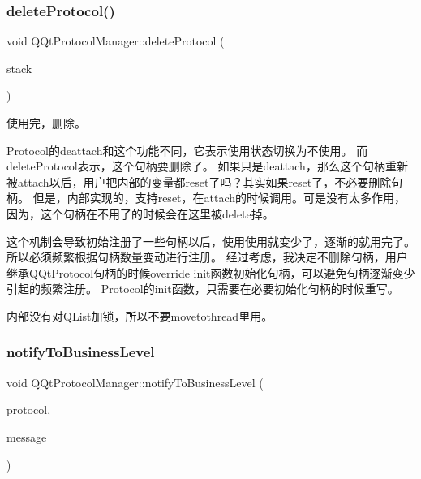 \subsubsection{\texorpdfstring{delete\+Protocol()}{deleteProtocol()}}
{\footnotesize\ttfamily void Q\+Qt\+Protocol\+Manager\+::delete\+Protocol (\begin{DoxyParamCaption}\item[{\mbox{\hyperlink{class_q_qt_protocol}{Q\+Qt\+Protocol}} $\ast$}]{stack }\end{DoxyParamCaption})}

使用完，删除。

Protocol的deattach和这个功能不同，它表示使用状态切换为不使用。 而delete\+Protocol表示，这个句柄要删除了。 如果只是deattach，那么这个句柄重新被attach以后，用户把内部的变量都reset了吗？其实如果reset了，不必要删除句柄。 但是，内部实现的，支持reset，在attach的时候调用。可是没有太多作用，因为，这个句柄在不用了的时候会在这里被delete掉。

这个机制会导致初始注册了一些句柄以后，使用使用就变少了，逐渐的就用完了。所以必须频繁根据句柄数量变动进行注册。 经过考虑，我决定不删除句柄，用户继承\+Q\+Qt\+Protocol句柄的时候override init函数初始化句柄，可以避免句柄逐渐变少引起的频繁注册。 Protocol的init函数，只需要在必要初始化句柄的时候重写。

内部没有对\+Q\+List加锁，所以不要movetothread里用。 \mbox{\label{class_q_qt_protocol_manager_aac4faf21da374d2371f3ecc25324c5ed}} 
\subsubsection{\texorpdfstring{notify\+To\+Business\+Level}{notifyToBusinessLevel}}
{\footnotesize\ttfamily void Q\+Qt\+Protocol\+Manager\+::notify\+To\+Business\+Level (\begin{DoxyParamCaption}\item[{const \mbox{\hyperlink{class_q_qt_protocol}{Q\+Qt\+Protocol}} $\ast$}]{protocol,  }\item[{const \mbox{\hyperlink{class_q_qt_message}{Q\+Qt\+Message}} $\ast$}]{message }\end{DoxyParamCaption})\hspace{0.3cm}{\ttfamily [signal]}}



